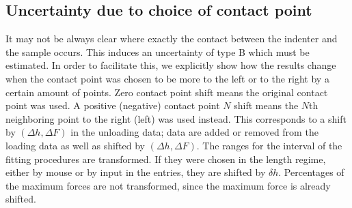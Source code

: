  
 \subsection{Uncertainty due to choice of contact point}
 It may not be always clear where exactly the contact between the indenter and the sample occurs. This induces an uncertainty of type B which must be estimated.
 In order to facilitate this, we explicitly show how the results change when the contact point was chosen to be more to the left or to the right by a certain amount of points. 
 Zero contact point shift means the original contact point was used. A positive (negative) contact point $N$ shift means the $N$th neighboring point to the right (left) was used instead. 
 This corresponds to a shift by $(\Delta h, \Delta F)$ in the unloading data; data are added or removed from the loading data as well as shifted by $(\Delta h, \Delta F)$.
 The ranges for the interval of the fitting procedures are transformed. If they were chosen in the length regime, either by mouse or by input in the entries, they are shifted by $\delta h$.
 Percentages of the maximum forces are not transformed, since the maximum force is already shifted. 
 
